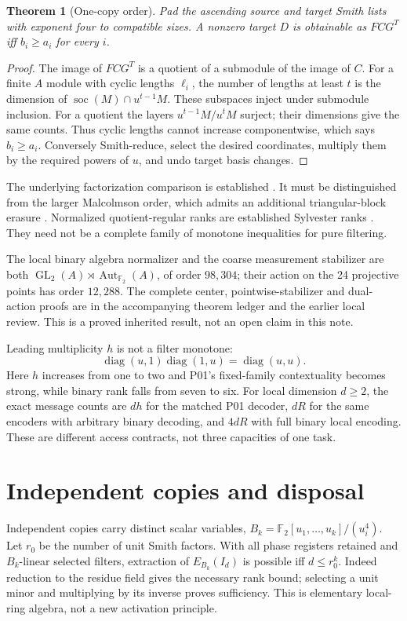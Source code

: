 \documentclass[11pt]{article}
\newtheorem{theorem}{Theorem}
\newcommand{\F}{\mathbb F_2}
\DeclareMathOperator{\GL}{GL}
\DeclareMathOperator{\diag}{diag}
\begin{document}
\begin{theorem}[One-copy order]
Pad the ascending source and target Smith lists with exponent four to compatible
sizes. A nonzero target $D$ is obtainable as $FCG^T$ iff $b_i\geq a_i$ for every $i$.
\end{theorem}
\begin{proof}
The image of $FCG^T$ is a quotient of a submodule of the image of $C$.
For a finite $A$ module with cyclic lengths $\ell_i$, the number of lengths at
least $t$ is the dimension of $\operatorname{soc}(M)\cap u^{t-1}M$. These
subspaces inject under submodule inclusion. For a quotient the layers
$u^{t-1}M/u^tM$ surject; their dimensions give the same counts. Thus cyclic
lengths cannot increase componentwise, which says $b_i\geq a_i$. Conversely
Smith-reduce, select the desired coordinates, multiply them by the required
powers of $u$, and undo target basis changes.
\end{proof}
The underlying factorization comparison is established
\cite{APGPS,Antoine}. It must be distinguished from the larger Malcolmson
order, which admits an additional triangular-block erasure \cite{HungLi}.
Normalized quotient-regular ranks are established Sylvester ranks \cite{JL}.
They need not be a complete family of monotone inequalities for pure filtering.

The local binary algebra normalizer and the coarse measurement stabilizer are
both $\GL_2(A)\rtimes\operatorname{Aut}_{\F}(A)$, of order $98,304$; their
action on the 24 projective points has order $12,288$. The complete center,
pointwise-stabilizer and dual-action proofs are in the accompanying theorem
ledger and the earlier local review. This is a proved inherited result, not an
open claim in this note.

Leading multiplicity $h$ is not a filter monotone:
\[
 \diag(u,1)\diag(1,u)=\diag(u,u).
\]
Here $h$ increases from one to two and P01's fixed-family contextuality becomes
strong, while binary rank falls from seven to six. For local dimension $d\geq2$,
the exact message counts are $dh$ for the matched P01 decoder, $dR$ for the
same encoders with arbitrary binary decoding, and $4dR$ with full binary local
encoding. These are different access contracts, not three capacities of one task.

\section{Independent copies and disposal}
Independent copies carry distinct scalar variables,
$B_k=\F[u_1,\ldots,u_k]/(u_i^4)$. Let $r_0$ be the number of unit Smith factors.
With all phase registers retained and $B_k$-linear selected filters, extraction
of $E_{B_k}(I_d)$ is possible iff $d\leq r_0^k$. Indeed reduction to the residue
field gives the necessary rank bound; selecting a unit minor and multiplying
by its inverse proves sufficiency. This is elementary local-ring algebra,
not a new activation principle.
\end{document}

